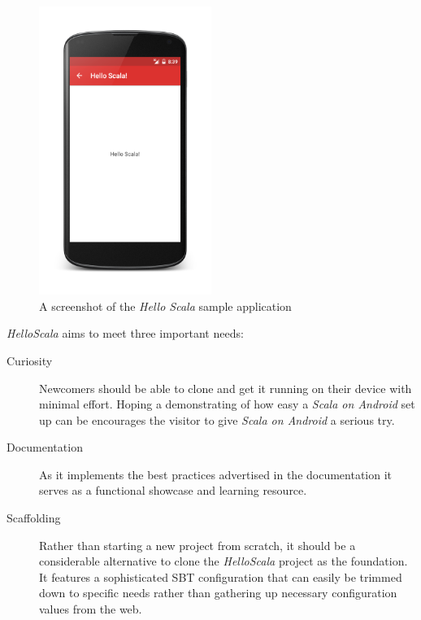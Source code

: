 \begin{description}
	\begin{figure}[ht]
		\center
		\includegraphics[width=0.5\textwidth]{asset/hello-scala.png}
		\caption{A screenshot of the \textit{Hello Scala} sample application}
		\label{hello-scala}
	\end{figure}

	\textit{HelloScala} aims to meet three important needs:

	\begin{description}

		\item[Curiosity]\hfill

		Newcomers should be able to clone and get it running on their device with minimal effort. Hoping a demonstrating of how easy a \textit{Scala on Android} set up can be encourages the visitor to give \textit{Scala on Android} a serious try.

		\item[Documentation]\hfill

		As it implements the best practices advertised in the documentation it serves as a functional showcase and learning resource.

		\item[Scaffolding]\hfill

		Rather than starting a new project from scratch, it should be a considerable alternative to clone the \textit{HelloScala} project as the foundation. It features a sophisticated \ac{SBT} configuration that can easily be trimmed down to specific needs rather than gathering up necessary configuration values from the web.

	\end{description}

\end{description}
